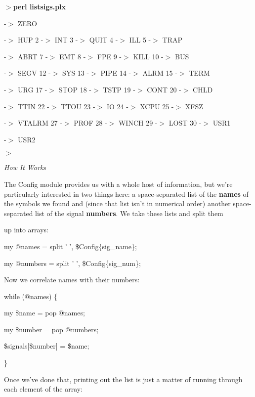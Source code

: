 \documentclass[a4paper,11pt]{book}
\begin{document}
\noindent 

\noindent $>$\textbf{perl listsigs.plx}

 -$>$ ZERO

 -$>$ HUP  2 -$>$ INT  3 -$>$ QUIT  4 -$>$ ILL  5 -$>$ TRAP

 -$>$ ABRT  7 -$>$ EMT  8 -$>$ FPE  9 -$>$ KILL  10 -$>$ BUS

 -$>$ SEGV  12 -$>$ SYS  13 -$>$ PIPE  14 -$>$ ALRM  15 -$>$ TERM

 -$>$ URG  17 -$>$ STOP  18 -$>$ TSTP  19 -$>$ CONT  20 -$>$ CHLD

 -$>$ TTIN  22 -$>$ TTOU  23 -$>$ IO  24 -$>$ XCPU  25 -$>$ XFSZ

 -$>$ VTALRM  27 -$>$ PROF  28 -$>$ WINCH  29 -$>$ LOST  30 -$>$ USR1

 -$>$ USR2

\noindent $>$

\noindent 

\noindent \textit{How It Works}

\noindent The Config module provides us with a whole host of information, but we're particularly interested in two things here: a space-separated list of the \textbf{names }of the symbols we found and (since that list isn't in numerical order) another space-separated list of the signal \textbf{numbers}. We take these lists and split them

\noindent up into arrays:

\noindent 

\noindent my @names = split ' ', \$Config\{sig\_name\};

\noindent my @numbers = split ' ', \$Config\{sig\_num\};

\noindent 

\noindent Now we correlate names with their numbers:

\noindent 

\noindent while (@names) \{

\noindent my \$name = pop @names;

\noindent my \$number = pop @numbers;

\noindent \$signals[\$number] = \$name;

\noindent \}

\noindent 

\noindent Once we've done that, printing out the list is just a matter of running through each element of the array:
\end{document}
